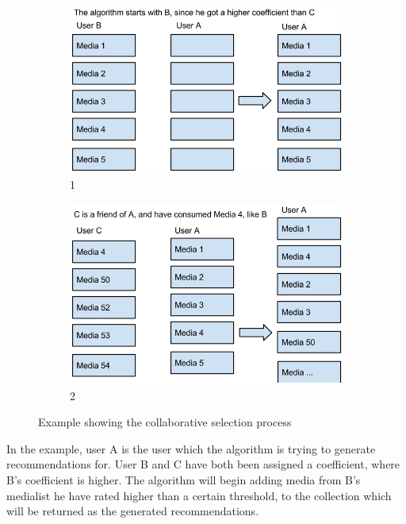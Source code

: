 \begin{figure}[H]
\centering
\begin{subfigure}{.5\textwidth}
  \centering
  \includegraphics[width=.9\linewidth]{Images/CollaborativeRecExample1.png}
  \caption{1}
  \label{fig:collarec1}
\end{subfigure}%
\begin{subfigure}{.5\textwidth}
  \centering
  \includegraphics[width=.9\linewidth]{Images/CollaborativeRecExample2.png}
  \caption{2}
  \label{fig:collarec2}
\end{subfigure}
\caption{Example showing the collaborative selection process}
\label{CollaEx}
\end{figure}

In the example, user A is the user which the algorithm is trying to generate recommendations for. User B and C have both been assigned a coefficient, where B’s coefficient is higher. The algorithm will begin adding media from B’s medialist he have rated higher than a certain threshold, to the collection which will be returned as the generated recommendations.

